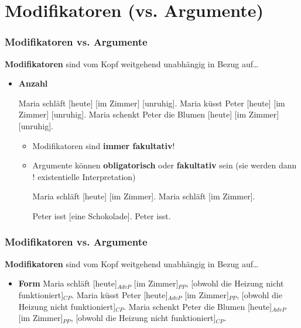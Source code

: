 \section{Modifikatoren (vs. Argumente)}

\begin{frame}
\frametitle{Modifikatoren vs. Argumente}

\textbf{Modifikatoren} sind vom Kopf weitgehend unabhängig in Bezug auf\dots

\begin{itemize}
	\item \textbf{Anzahl}

\eal 
\ex Maria schläft \alert{[heute] [im Zimmer] [unruhig]}.
\ex Maria küsst Peter \alert{[heute] [im Zimmer] [unruhig]}.
\ex Maria schenkt Peter die Blumen \alert{[heute] [im Zimmer] [unruhig]}.
\zl

	\begin{itemize}
		\item Modifikatoren sind \textbf{immer fakultativ}!
		\item Argumente können \textbf{obligatorisch} oder \textbf{fakultativ} sein (sie werden dann ! \ras existentielle Interpretation)
		
		\eal 
		\ex Maria schläft \alert{[heute] [im Zimmer]}.
		\ex Maria schläft \alert{[im Zimmer]}. 
		\zl
		
		\eal 
		\ex Peter isst \alert{[eine Schokolade]}.
		\ex Peter isst. 
		\zl
		
	\end{itemize}

\end{itemize}

\end{frame}


\begin{frame}
\frametitle{Modifikatoren vs. Argumente}

\textbf{Modifikatoren} sind vom Kopf weitgehend unabhängig in Bezug auf\dots

\begin{itemize}
	
	\item \textbf{Form}
\eal
\ex Maria schläft \alert{[heute]$_{AdvP}$ [im Zimmer]$_{PP}$, [obwohl die Heizung nicht funktioniert]$_{CP}$}.
\ex Maria küsst Peter \alert{[heute]$_{AdvP}$ [im Zimmer]$_{PP}$, [obwohl die Heizung nicht funktioniert]$_{CP}$}.
\ex Maria schenkt Peter die Blumen \alert{[heute]$_{AdvP}$ [im Zimmer]$_{PP}$, [obwohl die Heizung nicht funktioniert]$_{CP}$}.
\zl

\end{itemize}

\end{frame}


